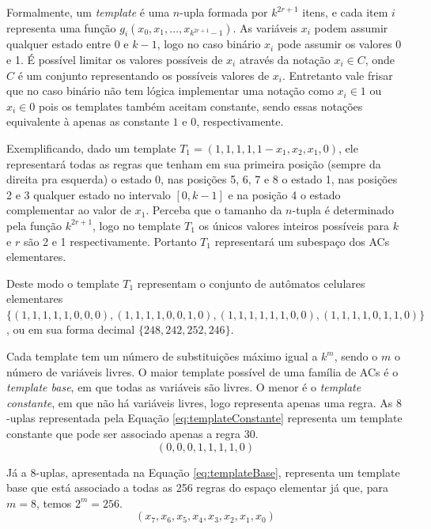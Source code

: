\documentclass[12pt,a4paper]{article}
\begin{document}
Formalmente, um \textit{template} é uma $n$-upla formada por $k^{2r+1}$ itens, e cada item $i$ representa uma função $g_i(x_0,x_1,\dots,x_{k^{2r+1}-1})$. As variáveis $x_i$ podem assumir qualquer estado entre 0 e $k-1$, logo no caso binário $x_i$ pode assumir os valores 0 e 1. É possível limitar os valores possíveis de $x_i$ através da notação $x_i \in C$, onde $C$ é um conjunto representando os possíveis valores de $x_i$. Entretanto vale frisar que no caso binário não tem lógica implementar uma notação como $x_i \in {1}$ ou $x_i \in {0}$ pois os templates também aceitam constante, sendo essas notações equivalente à apenas as constante $1$ e $0$, respectivamente.

Exemplificando, dado um template $T_1 = (1,1,1,1,1-x_1,x_2,x_1,0)$, ele representará todas as regras que tenham em sua primeira posição (sempre da direita pra esquerda) o estado 0, nas posições 5, 6, 7 e 8 o estado 1, nas posições 2 e 3 qualquer estado no intervalo $[0,k-1]$ e na posição 4 o estado complementar ao valor de $x_1$. Perceba que o tamanho da $n$-tupla é determinado pela função $k^{2r+1}$, logo no template $T_1$ os únicos valores inteiros possíveis para $k$ e $r$ são 2 e 1 respectivamente. Portanto $T_1$ representará um subespaço dos ACs elementares.

Deste modo o template $T_1$ representam o conjunto de autômatos celulares elementares $\{(1,1,1,1,1,0,0,0),(1,1,1,1,0,0,1,0),(1,1,1,1,1,1,0,0),(1,1,1,1,0,1,1,0)\}$, ou em sua forma decimal $\{248,242,252,246\}$.

Cada template tem um número de substituições máximo igual a $k^m$, sendo o $m$ o número de variáveis livres. O maior template possível de uma família de ACs é o \textit{template base}, em que todas as variáveis são livres. O menor é o \textit{template constante}, em que não há variáveis livres, logo representa apenas uma regra. As $8$-uplas representada pela Equação \ref{eq:templateConstante} representa um template constante que pode ser associado apenas a regra 30. 
\begin{equation}
(0,0,0,1,1,1,1,0)
\label{eq:templateConstante}
\end{equation}

Já a $8$-uplas, apresentada na Equação \ref{eq:templateBase}, representa um template base que está associado a todas as 256 regras do espaço elementar já que, para $m = 8$, temos $2^m = 256 $.
\begin{equation}
(x_7,x_6,x_5,x_4,x_3,x_2,x_1,x_0)
\label{eq:templateBase}
\end{equation}
\end{document}
